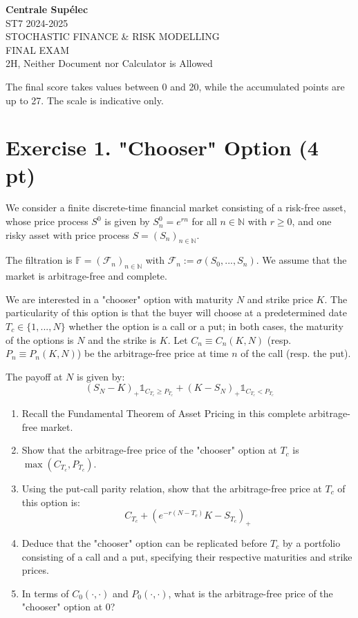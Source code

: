 \documentclass{article}
\begin{document}
\title{}
\author{}
\date{}


\begin{center}
    {\Large \textbf{Centrale Supélec}} \\
    ST7 2024-2025 \\
    STOCHASTIC FINANCE \& RISK MODELLING \\
    FINAL EXAM \\
    2H, Neither Document nor Calculator is Allowed
\end{center}

\vspace{0.5cm}
\noindent The final score takes values between 0 and 20, while the accumulated points are up to 27. The scale is indicative only.

\section*{Exercise 1. "Chooser" Option (4 pt)}

We consider a finite discrete-time financial market consisting of a risk-free asset, whose price process $S^{0}$ is given by $S_{n}^{0}=e^{rn}$ for all $n\in\mathbb{N}$ with $r\ge0$, and one risky asset with price process $S=(S_{n})_{n\in \mathbb{N}}$.

The filtration is $\mathbb{F}=(\mathcal{F}_{n})_{n\in\mathbb{N}}$ with $\mathcal{F}_{n}:=\sigma(S_{0},...,S_{n})$. We assume that the market is arbitrage-free and complete.

We are interested in a "chooser" option with maturity $N$ and strike price $K$. The particularity of this option is that the buyer will choose at a predetermined date $T_{c}\in\{1,...,N\}$ whether the option is a call or a put; in both cases, the maturity of the options is $N$ and the strike is $K$. Let $C_{n}\equiv C_{n}(K,N)$ (resp. $P_{n}\equiv P_{n}(K,N)$) be the arbitrage-free price at time $n$ of the call (resp. the put).

The payoff at $N$ is given by:
\[ (S_{N}-K)_{+}\mathds{1}_{C_{T_{c}}\ge P_{T_{c}}} + (K-S_{N})_{+}\mathds{1}_{C_{T_{c}}<P_{T_{c}}} \]

\begin{enumerate}
    \item Recall the Fundamental Theorem of Asset Pricing in this complete arbitrage-free market.
    \item Show that the arbitrage-free price of the "chooser" option at $T_{c}$ is $\max(C_{T_{c}},P_{T_{c}})$.
    \item Using the put-call parity relation, show that the arbitrage-free price at $T_{c}$ of this option is:
    \[ C_{T_{c}}+(e^{-r(N-T_{c})}K-S_{T_{c}})_{+} \]
    \item Deduce that the "chooser" option can be replicated before $T_{c}$ by a portfolio consisting of a call and a put, specifying their respective maturities and strike prices.
    \item In terms of $C_{0}(\cdot,\cdot)$ and $P_{0}(\cdot,\cdot)$, what is the arbitrage-free price of the "chooser" option at 0?
\end{enumerate}
\end{document}

